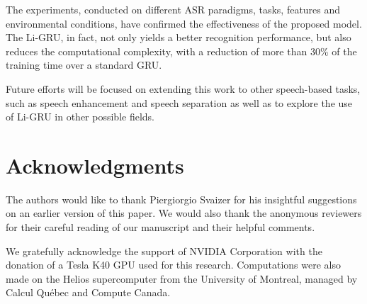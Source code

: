 \documentclass[journal]{IEEEtran}
\begin{document}
The experiments, conducted on different ASR paradigms, tasks, features and environmental conditions, have confirmed the effectiveness of the proposed model. The Li-GRU, in fact, not only yields a better recognition performance, but also reduces the computational complexity, with a reduction of more than 30\% of the training time over a standard GRU.

Future efforts will be focused on extending this work to other speech-based tasks, such as speech enhancement and speech separation as well as to explore the use of Li-GRU in other possible fields.





 \section*{Acknowledgments}
 The authors would like to thank Piergiorgio Svaizer for his insightful suggestions on an earlier version of this paper. We would also thank the anonymous reviewers for their careful reading of our manuscript and their helpful comments.

We gratefully acknowledge the support of NVIDIA Corporation with the donation of a Tesla K40 GPU used for this research. Computations were also made on the Helios supercomputer from the University of Montreal, managed by Calcul Québec and Compute Canada.



\end{document}
